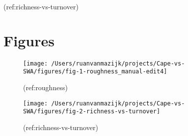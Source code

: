 (ref:richness-vs-turnover)

\hypertarget{figures}{%
\section*{Figures}\label{figures}}

\begin{figure}[H]
\texttt{[image: /Users/ruanvanmazijk/projects/Cape-vs-SWA/figures/fig-1-roughness\_manual-edit4]} \caption{(ref:roughness)}\label{fig:roughness}
\end{figure}

\begin{figure}[H]
\texttt{[image: /Users/ruanvanmazijk/projects/Cape-vs-SWA/figures/fig-2-richness-vs-turnover]} \caption{(ref:richness-vs-turnover)}\label{fig:richness-vs-turnover}
\end{figure}
